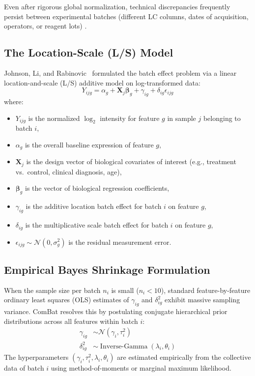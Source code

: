 \documentclass[11pt,oneside]{book}
\begin{document}
Even after rigorous global normalization, technical discrepancies frequently persist between experimental batches (different LC columns, dates of acquisition, operators, or reagent lots) \cite{johnson2007adjusting, leek2010tackling}.

\subsection{The Location-Scale (L/S) Model}

Johnson, Li, and Rabinovic~\cite{johnson2007adjusting} formulated the batch effect problem via a linear location-and-scale (L/S) additive model on log-transformed data:
\begin{equation}
\label{eq:combat_model}
Y_{ijg} = \alpha_g + \mathbf{X}_j \boldsymbol{\beta}_g + \gamma_{ig} + \delta_{ig} \epsilon_{ijg}
\end{equation}
where:
\begin{itemize}
    \item $Y_{ijg}$ is the normalized $\log_2$ intensity for feature $g$ in sample $j$ belonging to batch $i$,
    \item $\alpha_g$ is the overall baseline expression of feature $g$,
    \item $\mathbf{X}_j$ is the design vector of biological covariates of interest (e.g., treatment vs.\ control, clinical diagnosis, age),
    \item $\boldsymbol{\beta}_g$ is the vector of biological regression coefficients,
    \item $\gamma_{ig}$ is the additive location batch effect for batch $i$ on feature $g$,
    \item $\delta_{ig}$ is the multiplicative scale batch effect for batch $i$ on feature $g$,
    \item $\epsilon_{ijg} \sim \mathcal{N}(0, \sigma_g^2)$ is the residual measurement error.
\end{itemize}

\subsection{Empirical Bayes Shrinkage Formulation}

When the sample size per batch $n_i$ is small ($n_i < 10$), standard feature-by-feature ordinary least squares (OLS) estimates of $\gamma_{ig}$ and $\delta_{ig}^2$ exhibit massive sampling variance. ComBat resolves this by postulating conjugate hierarchical prior distributions across all features within batch $i$:
\begin{align}
\gamma_{ig} &\sim \mathcal{N}(\gamma_i, \tau_i^2) \\
\delta_{ig}^2 &\sim \operatorname{Inverse-Gamma}(\lambda_i, \theta_i)
\end{align}
The hyperparameters $(\gamma_i, \tau_i^2, \lambda_i, \theta_i)$ are estimated empirically from the collective data of batch $i$ using method-of-moments or marginal maximum likelihood.
\end{document}
